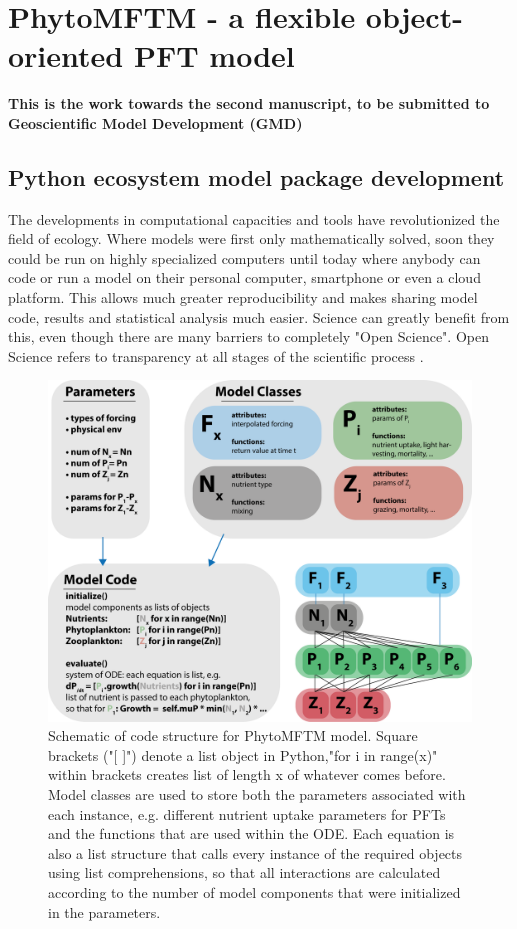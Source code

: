 \chapter{PhytoMFTM - a flexible object-oriented PFT model}


\small {\textbf{This is the work towards the second manuscript, to be submitted to Geoscientific Model Development (GMD)}}


\normalsize
\section{Python ecosystem model package development}
The developments in computational capacities and tools have revolutionized the field of ecology. Where models were first only mathematically solved, soon they could be run on highly specialized computers until today where anybody can code or run a model on their personal computer, smartphone or even a cloud platform. This allows much greater reproducibility and makes sharing model code, results and statistical analysis much easier. Science can greatly benefit from this, even though there are many barriers to completely "Open Science". Open Science refers to transparency at all stages of the scientific process \citep{Hampton2015}.

\begin{figure}
\centering
\includegraphics[trim = 0mm 0mm 0mm 0mm, clip, width=1.\linewidth]{./Chp22-Pre2/OOPmodelstructureDraft.png}
\caption[Scheme]{\small {Schematic of code structure for PhytoMFTM model. Square brackets ("[ ]") denote a list object in Python,"for i in range(x)" within brackets creates list of length x of whatever comes before. Model classes are used to store both the parameters associated with each instance, e.g. different nutrient uptake parameters for PFTs and the functions that are used within the ODE. Each equation is also a list structure that calls every instance of the required objects using list comprehensions, so that all interactions are calculated according to the number of model components that were initialized in the parameters.}}
\label{PhytoMFTM}
\end{figure}

